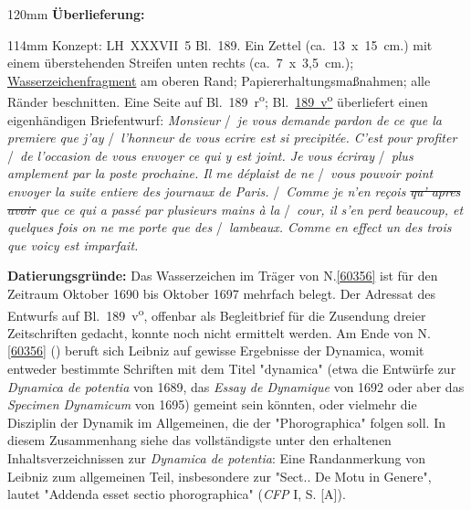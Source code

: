 \begin{ledgroupsized}[r]{120mm}
\footnotesize
\pstart
\noindent\textbf{Überlieferung:}
\pend
\end{ledgroupsized}
\begin{ledgroupsized}[r]{114mm}
\footnotesize
\pstart \parindent -6mm
%
Konzept:
LH~XXXVII~5 Bl.~189. 
Ein Zettel (ca.~13~x~15~cm.) mit einem überstehenden Streifen unten rechts (ca.~7~x~3,5~cm.);
\href{\Scan{LH_37_05_189wz}}%
{Wasserzeichenfragment} am oberen Rand;
Papier\-erhaltungsmaßnahmen;
alle Ränder beschnitten.
Eine Seite auf Bl.~189~r\textsuperscript{o};
Bl.~\href{\Scan{LH_37_05_189v}}{189~v\textsuperscript{o}} 
überliefert einen eigenhändigen Briefentwurf:
%
\textit{Monsieur} \lbrack/\rbrack\
\textit{je vous demande pardon de ce que la premiere que j'ay} \lbrack/\rbrack\ \textit{l'honneur de vous ecrire est si precipitée. C'est pour profiter} \lbrack/\rbrack\ \textit{de l'occasion de vous envoyer ce qui y est joint. Je vous écriray} \lbrack/\rbrack\ \textit{plus amplement par la poste prochaine. Il me déplaist de ne} \lbrack/\rbrack\ \textit{vous pouvoir point envoyer la suite entiere des journaux de Paris.} \lbrack/\rbrack\ \textit{Comme je n'en reçois \sout{qu' apres avoir} que ce qui a passé par plusieurs mains à la} \lbrack/\rbrack\ \textit{cour, il s'en perd beaucoup, et quelques fois on ne me porte que des} \lbrack/\rbrack\ \textit{lambeaux. Comme en effect un des trois que voicy est imparfait.}
\pend
\end{ledgroupsized}
\vspace{5mm}
\begin{ledgroup}
\footnotesize
\pstart
\noindent%
\textbf{Datierungsgründe:}
Das Wasserzeichen im Träger von N.\;\ref{60356} ist für den Zeitraum Oktober 1690 bis Oktober 1697 mehrfach belegt.
Der Adressat des Entwurfs auf Bl.~189~v\textsuperscript{o}, offenbar als Begleitbrief für die Zusendung dreier Zeitschriften gedacht,
konnte noch nicht ermittelt werden.
\pend
\pstart
Am Ende von N.\;\ref{60356} () beruft sich Leibniz auf gewisse Ergebnisse der \glqq Dynamica\grqq, womit entweder bestimmte Schriften mit dem Titel "dynamica" (etwa die Entwürfe zur \cite{01354}\textit{Dynamica de potentia} von 1689, das \cite{02167}\textit{Essay de Dynamique} von 1692 oder aber das \cite{02032}\textit{Specimen Dynamicum} von 1695) gemeint sein könnten,
oder vielmehr die Disziplin der Dynamik im Allgemeinen, die der "Phorographica" folgen soll.
In diesem Zusammenhang siehe das vollständigste unter den erhaltenen Inhaltsverzeichnissen zur \textit{Dynamica de potentia}: Eine Randanmerkung von Leibniz zum allgemeinen Teil, insbesondere zur "Sect.. De Motu in Genere", lautet "Addenda esset sectio phorographica" (\cite{01354}\textit{CFP} I, S. [A]).
\pend
\end{ledgroup}
